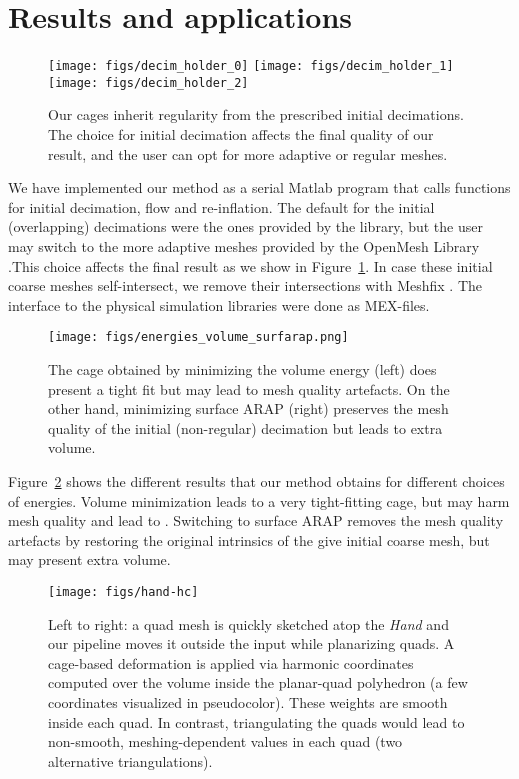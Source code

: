 \section{Results and applications}
\label{sec:results}

\begin{figure}
  \texttt{[image: figs/decim\_holder\_0]}
    \texttt{[image: figs/decim\_holder\_1]}
      \texttt{[image: figs/decim\_holder\_2]}
  \caption{Our cages inherit regularity from the prescribed initial decimations.
  The choice for initial decimation affects the final quality of our result,
  and the user can opt for more adaptive or regular meshes.}
  \label{fig:decimations}
\end{figure}

We have implemented our method as a serial Matlab program
that calls functions for initial decimation, flow and re-inflation.
The default for the initial (overlapping) decimations
were the ones provided by the \cite{cgal} library, but the user may
switch to the more adaptive meshes provided by the OpenMesh
Library \cite{openmesh}.This choice affects the final result as
we show in Figure~\ref{fig:decimations}.  In case these initial coarse
meshes self-intersect,
we remove their intersections with Meshfix \cite{Attene:2010vv}. The interface to the
physical simulation libraries were done as MEX-files.

\begin{figure}
  \texttt{[image: figs/energies\_volume\_surfarap.png]}
  \caption{The cage obtained by minimizing the volume energy (left)
  does present a tight fit but may lead to mesh quality artefacts.
  On the other hand, minimizing surface ARAP (right) preserves the mesh
  quality of the initial (non-regular) decimation but leads to extra volume.}
  \label{fig:energies}
\end{figure}

Figure~\ref{fig:energies} shows the different results that our method obtains
for different choices of energies. Volume minimization leads to a very
tight-fitting cage, but may harm mesh quality and lead to . Switching to surface ARAP removes the mesh quality
artefacts by restoring the original intrinsics of the give initial coarse mesh,
but may present extra volume.

\begin{figure}
  \texttt{[image: figs/hand-hc]}
  \caption{Left to right: a quad mesh is quickly sketched atop the \emph{Hand}
  and our pipeline moves it outside the input while planarizing quads. A
  cage-based deformation is applied via harmonic coordinates computed over the
  volume inside the planar-quad polyhedron (a few coordinates visualized in
  pseudocolor). These weights are smooth inside each quad. In contrast,
  triangulating the quads would lead to non-smooth, meshing-dependent values in
  each quad (two alternative triangulations).}
  \label{fig:hand-hc}
\end{figure}

